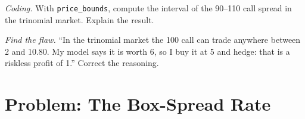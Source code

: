 \begin{exercise}[$\star\star\star$]\label{exo:dv:no-arbitrage-and-the-fundamental-theorems:7}
\emph{Coding.} With \texttt{price\_bounds}, compute the interval of the 90--110
call spread in the trinomial market. Explain the result.
\end{exercise}

\begin{exercise}[$\star\star\star$]\label{exo:dv:no-arbitrage-and-the-fundamental-theorems:8}
\emph{Find the flaw.} ``In the trinomial market the 100 call can trade anywhere
between 2 and 10.80. My model says it is worth 6, so I buy it at 5 and hedge: that
is a riskless profit of 1.'' Correct the reasoning.
\end{exercise}

\section{Problem: The Box-Spread Rate}

